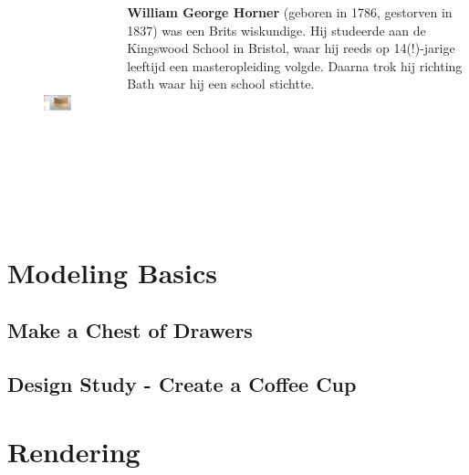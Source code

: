 \begin{frame}
       \begin{columns}
             \centering
						
						\begin{figure}
							\centering
								\includegraphics[height=5cm, width=3.5cm]{img/AddingEdges.JPG}
							\label{fig:AddingEdges}
						\end{figure}
						
              \textbf{William George Horner} (geboren in 1786, gestorven in 1837) was een Brits
                wiskundige. Hij studeerde aan de Kingswood School in Bristol, waar hij reeds op
                14(!)-jarige leeftijd een masteropleiding volgde. Daarna trok hij richting Bath
                 waar hij een school stichtte.
         \end{columns} 
\end{frame}



\section{Modeling Basics}


\subsection{Make a Chest of Drawers}

\subsection{Design Study - Create a Coffee Cup}



\section{Rendering}



